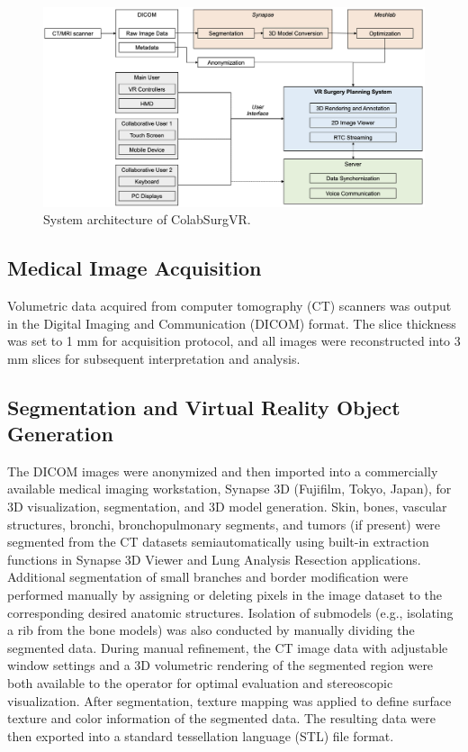 \documentclass[sn-mathphys-num]{sn-jnl}%
\theoremstyle{thmstyleone}%
\theoremstyle{thmstyletwo}%
\theoremstyle{thmstylethree}%
\begin{document}
\begin{figure}
  \centering
  \includegraphics[width=.9\linewidth]{../Media/Scheme}  
  \caption{System architecture of ColabSurgVR.}
  \label{fig:Scheme}
\end{figure}

\subsection{Medical Image Acquisition}
Volumetric data acquired from computer tomography (CT) scanners was output in the Digital Imaging and Communication (DICOM) format. The slice thickness was set to 1 mm for acquisition protocol, and all images were reconstructed into 3 mm slices for subsequent interpretation and analysis.
\subsection{Segmentation and Virtual Reality Object Generation}
The DICOM images were anonymized and then imported into a commercially available medical imaging workstation, Synapse 3D (Fujifilm, Tokyo, Japan), for 3D visualization, segmentation, and 3D model generation. Skin, bones, vascular structures, bronchi, bronchopulmonary segments, and tumors (if present) were segmented from the CT datasets semiautomatically using built-in extraction functions in Synapse 3D Viewer and Lung Analysis Resection applications. Additional segmentation of small branches and border modification were performed manually by assigning or deleting pixels in the image dataset to the corresponding desired anatomic structures. Isolation of submodels (e.g., isolating a rib from the bone models) was also conducted by manually dividing the segmented data. During manual refinement, the CT image data with adjustable window settings and a 3D volumetric rendering of the segmented region were both available to the operator for optimal evaluation and stereoscopic visualization. After segmentation, texture mapping was applied to define surface texture and color information of the segmented data. The resulting data were then exported into a standard tessellation language (STL) file format.
\end{document}

